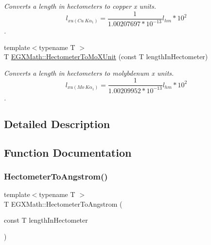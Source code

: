 \begin{DoxyCompactItemize}
\begin{DoxyCompactList}\small\item\em Converts a length in hectometers to copper x units. \[ l_{xu(Cu\ K\alpha_1)}= \frac{1}{1.00207697*10^{-13}} l_{hm} * 10^{2}\]. \end{DoxyCompactList}\item 
{\footnotesize template$<$typename T $>$ }\\T \mbox{\hyperlink{group___e_g_x_math-_conversions-_length_conversions-_s_i-_hectometer-_non-_s_i_gac2840604040746ae9a4c51fd1bb3e6f6}{E\+G\+X\+Math\+::\+Hectometer\+To\+Mo\+X\+Unit}} (const T length\+In\+Hectometer)
\begin{DoxyCompactList}\small\item\em Converts a length in hectometers to molybdenum x units. \[ l_{xu(Mo\ K\alpha_1)}=\frac{1}{1.00209952*10^{-13}} l_{hm} * 10^{2}\]. \end{DoxyCompactList}\end{DoxyCompactItemize}


\subsection{Detailed Description}


\subsection{Function Documentation}
\mbox{\label{group___e_g_x_math-_conversions-_length_conversions-_s_i-_hectometer-_non-_s_i_gad1296c0169aa8a99802a30b65a2ea516}} 
\subsubsection{\texorpdfstring{Hectometer\+To\+Angstrom()}{HectometerToAngstrom()}}
{\footnotesize\ttfamily template$<$typename T $>$ \\
T E\+G\+X\+Math\+::\+Hectometer\+To\+Angstrom (\begin{DoxyParamCaption}\item[{const T}]{length\+In\+Hectometer }\end{DoxyParamCaption})}



